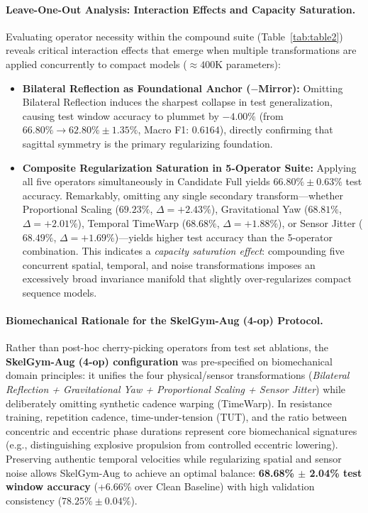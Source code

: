 \documentclass[runningheads]{llncs}
\begin{document}
\paragraph{Leave-One-Out Analysis: Interaction Effects and Capacity Saturation.}
Evaluating operator necessity within the compound suite (Table~\ref{tab:table2}) reveals critical interaction effects that emerge when multiple transformations are applied concurrently to compact models ($\approx 400\text{K}$ parameters):
\begin{itemize}
    \item \textbf{Bilateral Reflection as Foundational Anchor ($-$Mirror):} Omitting Bilateral Reflection induces the sharpest collapse in test generalization, causing test window accuracy to plummet by $-4.00\%$ (from $66.80\% \to 62.80\% \pm 1.35\%$, Macro F1: $0.6164$), directly confirming that sagittal symmetry is the primary regularizing foundation.
    \item \textbf{Composite Regularization Saturation in 5-Operator Suite:} Applying all five operators simultaneously in Candidate Full yields $66.80\% \pm 0.63\%$ test accuracy. Remarkably, omitting any single secondary transform---whether Proportional Scaling ($69.23\%$, $\Delta = +2.43\%$), Gravitational Yaw ($68.81\%$, $\Delta = +2.01\%$), Temporal TimeWarp ($68.68\%$, $\Delta = +1.88\%$), or Sensor Jitter ($68.49\%$, $\Delta = +1.69\%$)---yields higher test accuracy than the 5-operator combination. This indicates a \textit{capacity saturation effect}: compounding five concurrent spatial, temporal, and noise transformations imposes an excessively broad invariance manifold that slightly over-regularizes compact sequence models.
\end{itemize}

\paragraph{Biomechanical Rationale for the SkelGym-Aug (4-op) Protocol.}
Rather than post-hoc cherry-picking operators from test set ablations, the \textbf{SkelGym-Aug (4-op) configuration} was pre-specified on biomechanical domain principles: it unifies the four physical/sensor transformations (\textit{Bilateral Reflection + Gravitational Yaw + Proportional Scaling + Sensor Jitter}) while deliberately omitting synthetic cadence warping (TimeWarp). In resistance training, repetition cadence, time-under-tension (TUT), and the ratio between concentric and eccentric phase durations represent core biomechanical signatures (e.g., distinguishing explosive propulsion from controlled eccentric lowering). Preserving authentic temporal velocities while regularizing spatial and sensor noise allows SkelGym-Aug to achieve an optimal balance: \textbf{68.68\% $\pm$ 2.04\% test window accuracy} (+6.66\% over Clean Baseline) with high validation consistency ($78.25\% \pm 0.04\%$).
\end{document}
